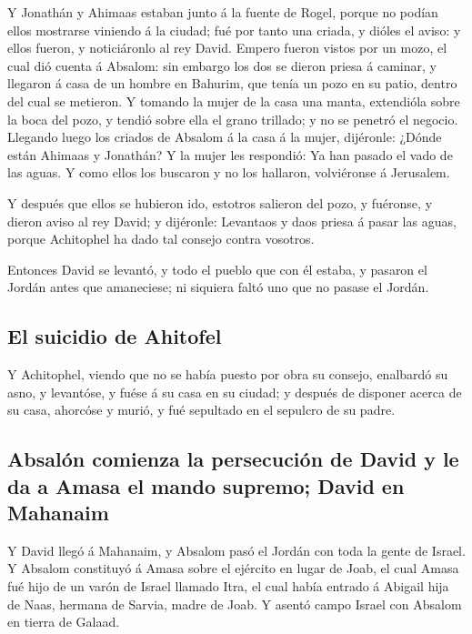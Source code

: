  Y Jonathán y Ahimaas estaban junto á la fuente de Rogel,
porque no podían ellos mostrarse viniendo á la ciudad; fué por tanto una
criada, y dióles el aviso: y ellos fueron, y noticiáronlo al rey David.
 Empero fueron vistos por un mozo, el cual dió cuenta á
Absalom: sin embargo los dos se dieron priesa á caminar, y llegaron á
casa de un hombre en Bahurim, que tenía un pozo en su patio, dentro del
cual se metieron.  Y tomando la mujer de la casa una manta,
extendióla sobre la boca del pozo, y tendió sobre ella el grano
trillado; y no se penetró el negocio.  Llegando luego los
criados de Absalom á la casa á la mujer, dijéronle: ¿Dónde están Ahimaas
y Jonathán? Y la mujer les respondió: Ya han pasado el vado de las
aguas. Y como ellos los buscaron y no los hallaron, volviéronse á
Jerusalem.

 Y después que ellos se hubieron ido, estotros salieron del
pozo, y fuéronse, y dieron aviso al rey David; y dijéronle: Levantaos y
daos priesa á pasar las aguas, porque Achitophel ha dado tal consejo
contra vosotros.

 Entonces David se levantó, y todo el pueblo que con él
estaba, y pasaron el Jordán antes que amaneciese; ni siquiera faltó uno
que no pasase el Jordán.

\hypertarget{el-suicidio-de-ahitofel}{%
\subsection{El suicidio de Ahitofel}\label{el-suicidio-de-ahitofel}}

 Y Achitophel, viendo que no se había puesto por obra su
consejo, enalbardó su asno, y levantóse, y fuése á su casa en su ciudad;
y después de disponer acerca de su casa, ahorcóse y murió, y fué
sepultado en el sepulcro de su padre.

\hypertarget{absaluxf3n-comienza-la-persecuciuxf3n-de-david-y-le-da-a-amasa-el-mando-supremo-david-en-mahanaim}{%
\subsection{Absalón comienza la persecución de David y le da a Amasa el
mando supremo; David en
Mahanaim}\label{absaluxf3n-comienza-la-persecuciuxf3n-de-david-y-le-da-a-amasa-el-mando-supremo-david-en-mahanaim}}

 Y David llegó á Mahanaim, y Absalom pasó el Jordán con
toda la gente de Israel.  Y Absalom constituyó á Amasa
sobre el ejército en lugar de Joab, el cual Amasa fué hijo de un varón
de Israel llamado Itra, el cual había entrado á Abigail hija de Naas,
hermana de Sarvia, madre de Joab.  Y asentó campo Israel
con Absalom en tierra de Galaad.

